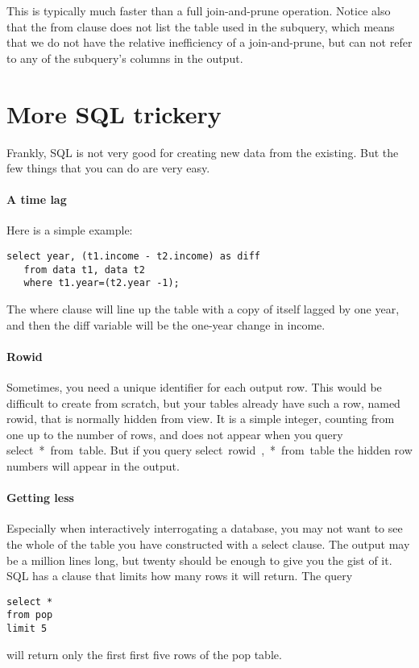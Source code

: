 This is typically much faster than a full join-and-prune operation.
Notice also that the \si{from} clause does not list the table used in
the subquery, which means that we do not have the relative inefficiency
of a join-and-prune, but can not refer to any of the subquery's columns
in the output.


\section{More SQL trickery} Frankly, SQL is not very good for
creating new data from the existing. But the few things that you can do
are very easy.

\paragraph{A time lag} Here is a simple example:
\begin{lstlisting}
select year, (t1.income - t2.income) as diff
   from data t1, data t2
   where t1.year=(t2.year -1);
\end{lstlisting}


The \si{where} clause will line up the table with a copy of itself
lagged by one year, and then the \si{diff} variable will be the
one-year change in income.


\paragraph{Rowid} Sometimes, you need a unique identifier for each
output row. This would be difficult to create from scratch, but your
tables already have such a row, named \si{rowid}, that is normally
hidden from view. It is a simple integer, counting from one up to the
number of rows, and does not appear when you query \si{select *
from table}. But if you query \si{select rowid, * from table}
the hidden row numbers will appear in the output.


\paragraph{Getting less} 
Especially when interactively interrogating a database, you may not want
to see the whole of the table you have constructed with a \si{select}
clause. The output may be a million lines long, but twenty should be
enough to give you the gist of it. SQL has a  clause that
limits how many rows it will return. The query
\begin{lstlisting}
select * 
from pop
limit 5
\end{lstlisting}
will return only the first first five rows of the \si{pop} table.

